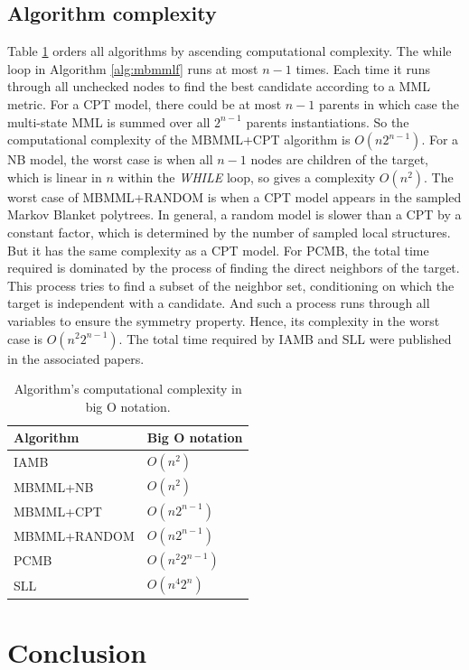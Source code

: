 \documentclass{svmult}
\begin{document}
\subsection{Algorithm complexity}
Table \ref{tb:bigo} orders all algorithms by ascending computational complexity. The while loop in Algorithm \ref{alg:mbmmlf} runs at most $n-1$ times. Each time it runs through all unchecked nodes to find the best candidate according to a MML metric. For a CPT model, there could be at most $n-1$ parents in which case the multi-state MML is summed over all $2^{n-1}$ parents instantiations. So the computational complexity of the MBMML+CPT algorithm is $O(n2^{n-1})$. For a NB model, the worst case is when all $n-1$ nodes are children of the target, which is linear in $n$ within the \textit{WHILE} loop, so gives a complexity $O(n^2)$. The worst case of MBMML+RANDOM is when a CPT model appears in the sampled Markov Blanket polytrees. In general, a random model is slower than a CPT by a constant factor, which is determined by the number of sampled local structures. But it has the same complexity as a CPT model. For PCMB, the total time required is dominated by the process of finding the direct neighbors of the target. This process tries to find a subset of the neighbor set, conditioning on which the target is independent with a candidate. And such a process runs through all variables to ensure the symmetry property. Hence, its complexity in the worst case is $O(n^2 2^{n-1})$. The total time required by IAMB and SLL were published in the associated papers. 
\begin{table}[]
\centering
\caption{Algorithm's computational complexity in big O notation.}
\label{tb:bigo}
\begin{tabular}{ll}
\hline
Algorithm    & Big O notation \\ \hline
IAMB      & $O(n^2)$      \\
MBMML+NB          &    $O(n^2)$    \\
MBMML+CPT          &   $O(n2^{n-1})$      \\
MBMML+RANDOM         & $O(n2^{n-1})$        \\
PCMB & $O(n^2 2^{n-1})$     \\
SLL        & $O(n^4 2^n)$       \\ \hline 
\end{tabular}
\end{table}


\section{Conclusion}
\label{sec:disc}
\end{document}
